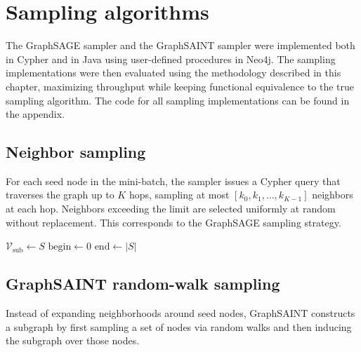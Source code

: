 \documentclass[PhD,single]{uclathes}
\begin{document}
\section{Sampling algorithms}\label{sec:sampling_algs}
The GraphSAGE sampler and the GraphSAINT sampler were implemented both in
Cypher and in Java using user-defined procedures in Neo4j. The sampling
implementations were then evaluated using the methodology described in this
chapter, maximizing throughput while keeping functional equivalence to the true
sampling algorithm. The code for all sampling implementations can be found in
the appendix.

\subsection{Neighbor sampling}
For each seed node in the mini-batch, the sampler issues a Cypher query that
traverses the graph up to $K$ hops, sampling at most
$[k_0, k_1, \ldots, k_{K-1}]$ neighbors at each hop. Neighbors exceeding the
limit are selected uniformly at random without replacement. This corresponds to
the GraphSAGE sampling strategy.

\begin{algorithm}[H]
\footnotesize
\caption{Neighbor Sampling}
\label{algo:neighbor_sampling}
\DontPrintSemicolon
{}

$\mathcal{V}_{\mathrm{sub}} \leftarrow S$\;
$\mathrm{begin} \leftarrow 0$\;
$\mathrm{end} \leftarrow |S|$\;

\;
\end{algorithm}

\subsection{GraphSAINT random-walk sampling}
Instead of expanding neighborhoods around seed nodes, GraphSAINT constructs a
subgraph by first sampling a set of nodes via random walks and then inducing
the subgraph over those nodes.
\end{document}
